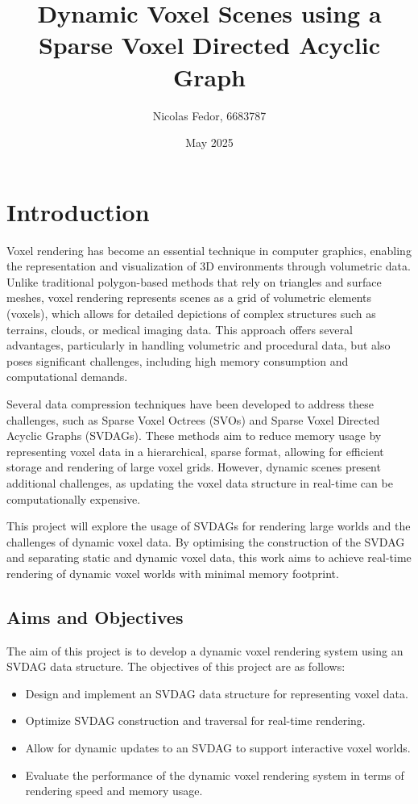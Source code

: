 \documentclass{article}
\title{Dynamic Voxel Scenes using a Sparse Voxel Directed Acyclic Graph}
\author{Nicolas Fedor, 6683787}
\date{May 2025}
\begin{document}
\maketitle

\section{Introduction}
Voxel rendering has become an essential technique in computer graphics, enabling the representation and visualization of 3D environments through volumetric data. Unlike traditional polygon-based methods that rely on triangles and surface meshes, voxel rendering represents scenes as a grid of volumetric elements (voxels), which allows for detailed depictions of complex structures such as terrains, clouds, or medical imaging data. This approach offers several advantages, particularly in handling volumetric and procedural data, but also poses significant challenges, including high memory consumption and computational demands.

Several data compression techniques have been developed to address these challenges, such as Sparse Voxel Octrees (SVOs) and Sparse Voxel Directed Acyclic Graphs (SVDAGs). These methods aim to reduce memory usage by representing voxel data in a hierarchical, sparse format, allowing for efficient storage and rendering of large voxel grids. However, dynamic scenes present additional challenges, as updating the voxel data structure in real-time can be computationally expensive.

This project will explore the usage of SVDAGs for rendering large worlds and the challenges of dynamic voxel data. By optimising the construction of the SVDAG and separating static and dynamic voxel data, this work aims to achieve real-time rendering of dynamic voxel worlds with minimal memory footprint.

\subsection{Aims and Objectives}
The aim of this project is to develop a dynamic voxel rendering system using an SVDAG data structure. The objectives of this project are as follows:

\begin{itemize}
    \item Design and implement an SVDAG data structure for representing voxel data.
    \item Optimize SVDAG construction and traversal for real-time rendering.
    \item Allow for dynamic updates to an SVDAG to support interactive voxel worlds.
    \item Evaluate the performance of the dynamic voxel rendering system in terms of rendering speed and memory usage.
\end{itemize}
\end{document}
